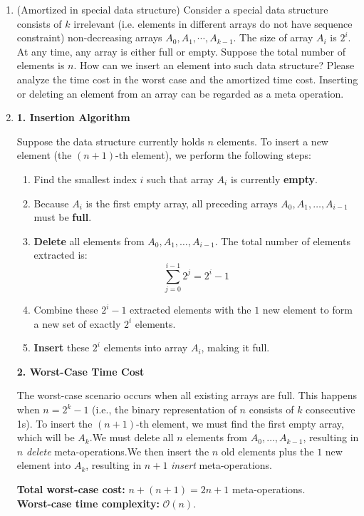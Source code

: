 \documentclass[12pt,a4paper]{article}
\makeatletter
\newtheorem*{solution}{Solution}
\theoremstyle{definition}
\renewenvironment{solution}[1][Solution] {\par\pushQED{\qed}\normalfont\topsep6\p@\@plus6\p@\relax\trivlist\item[\hskip\labelsep\bfseries#1\@addpunct{.}]\ignorespaces}{\popQED\endtrivlist\@endpefalse} \makeatother
\makeatother
\begin{document}
\begin{enumerate}
  \item {\color{purple}(Amortized
   in special data structure)} Consider a special data structure consists of $k$ irrelevant (i.e. elements in different arrays do not have sequence constraint) non-decreasing arrays $A_0, A_1, \cdots, A_{k-1}$. The size of array $A_i$ is $2^i$. At any time, any array is either full or empty. Suppose the total number of elements is $n$. How can we insert an element into such data structure? Please analyze the time cost in the worst case and the amortized time cost. Inserting or deleting an element from an array can be regarded as a meta operation.

    \begin{solution}
    
        \textbf{1. Insertion Algorithm}

Suppose the data structure currently holds $n$ elements. To insert a new element (the $(n+1)$-th element), we perform the following steps:
\begin{enumerate}
    \item Find the smallest index $i$ such that array $A_i$ is currently \textbf{empty}.
    \item Because $A_i$ is the first empty array, all preceding arrays $A_0, A_1, \dots, A_{i-1}$ must be \textbf{full}.
    \item \textbf{Delete} all elements from $A_0, A_1, \dots, A_{i-1}$. The total number of elements extracted is:
    $$ \sum_{j=0}^{i-1} 2^j = 2^i - 1 $$
    \item Combine these $2^i - 1$ extracted elements with the $1$ new element to form a new set of exactly $2^i$ elements.
    \item \textbf{Insert} these $2^i$ elements into array $A_i$, making it full.
\end{enumerate}

\textbf{2. Worst-Case Time Cost}

The worst-case scenario occurs when all existing arrays are full. This happens when $n = 2^k - 1$ (i.e., the binary representation of $n$ consists of $k$ consecutive 1s).
To insert the $(n+1)$-th element, we must find the first empty array, which will be $A_k$.We must delete all $n$ elements from $A_0, \dots, A_{k-1}$, resulting in $n$ \textit{delete} meta-operations.We then insert the $n$ old elements plus the $1$ new element into $A_k$, resulting in $n+1$ \textit{insert} meta-operations.

\textbf{Total worst-case cost:} $n + (n + 1) = 2n + 1$ meta-operations. \\
\textbf{Worst-case time complexity:} $\mathcal{O}(n)$.


\end{solution}
\end{enumerate}
\end{document}
